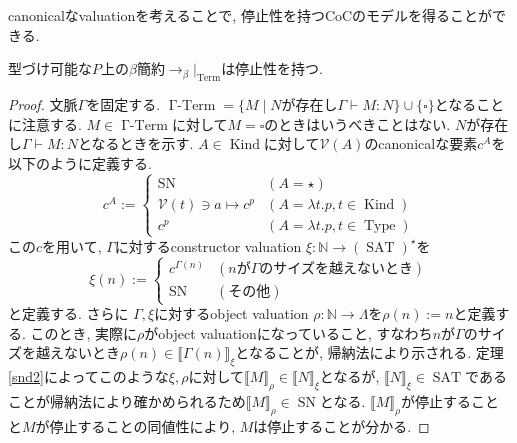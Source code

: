 \documentclass[12pt, titlepage]{ltjsarticle}
\DeclareMathOperator{\SN}{SN}
\DeclareMathOperator{\Term}{Term}
\DeclareMathOperator{\Type}{Type}
\DeclareMathOperator{\Kind}{Kind}
\DeclareMathOperator{\SAT}{SAT}
\DeclareMathOperator{\GTerm}{\Gamma-Term}
\newcommand{\iprt}[2]{\llbracket {#1} \rrbracket_ {#2}}
\begin{document}
canonicalなvaluationを考えることで, 停止性を持つCoCのモデルを得ることができる.

\begin{thm}
 型づけ可能な$P$上の$\beta$簡約$\rightarrow_{\beta}|_{\Term}$は停止性を持つ.
\end{thm}
\begin{proof}
 文脈$\Gamma$を固定する.
 $\GTerm = \{M \mid N \text{が存在し} \Gamma \vdash M \colon N\} \cup \{\square\}$となることに注意する.
 $M \in \GTerm$に対して$M = \square$のときはいうべきことはない. $N$が存在し$\Gamma \vdash M \colon N$となるときを示す.
 $A \in \Kind$に対して$\mathcal{V}(A)$のcanonicalな要素$c^A$を以下のように定義する.
 \[
  c^A := \begin{cases}
    \SN & (A = \star) \\
    \mathcal{V} (t) \ni a \mapsto c^p & (A = \lambda t. p, t \in \Kind) \\
    c^p & (A = \lambda t. p, t \in \Type)
  \end{cases}
 \]
 この$c$を用いて, $\Gamma$に対するconstructor valuation $\xi : \mathbb{N} \rightarrow (\SAT)^\star$を
 \[
  \xi(n) := \begin{cases}
    c^{\Gamma(n)} & (n \text{が} \Gamma \text{のサイズを越えないとき}) \\
    \SN & (その他)
  \end{cases}
 \]
 と定義する. さらに $\Gamma, \xi$に対するobject valuation $\rho : \mathbb{N} \rightarrow \Lambda$を$\rho (n) := n$と定義する.
 このとき, 実際に$\rho$がobject valuationになっていること, すなわち$n$が$\Gamma$のサイズを越えないとき$\rho(n) \in \iprt{\Gamma(n)}{\xi}$となることが, 帰納法により示される.
 定理\ref{snd2}によってこのような$\xi, \rho$に対して$\iprt{M}{\rho} \in \iprt{N}{\xi}$となるが, $\iprt{N}{\xi} \in \SAT$であることが帰納法により確かめられるため$\iprt{M}{\rho} \in \SN$となる. $\iprt{M}{\rho}$が停止することと$M$が停止することの同値性により, $M$は停止することが分かる.
\end{proof}


\end{document}
